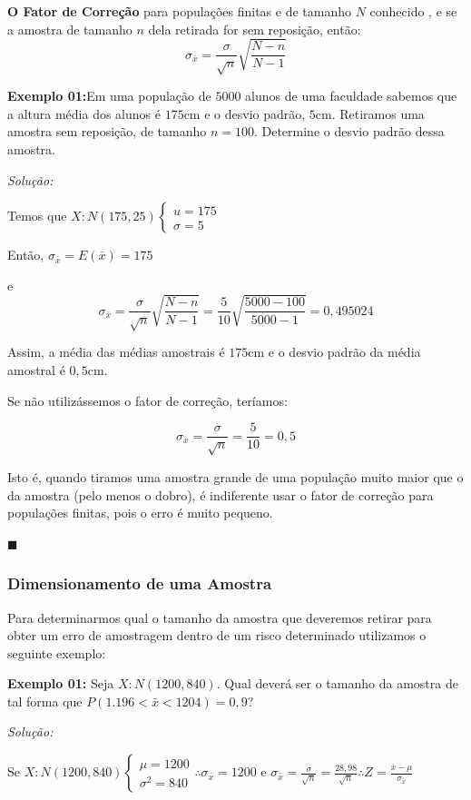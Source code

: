 \documentclass[oneside,a4paper,12pt]{article}
\begin{document}
{\bf O Fator de Correção} para populações finitas e de tamanho $N$ conhecido , e se a amostra de tamanho $n$ dela retirada for sem reposição, então:
$$\sigma_{\bar{x}} = \displaystyle \frac{\sigma}{\sqrt{n}}\sqrt{\frac{N - n}{N - 1}}$$

{\bf Exemplo 01:}Em uma população de $5000$ alunos de uma faculdade sabemos que a altura média dos alunos é $175$cm e o desvio padrão, $5$cm. Retiramos uma amostra sem reposição, de tamanho $n=100$. Determine o desvio padrão dessa amostra.

{\it Solução:}

Temos que $X:N(175,25) \begin{cases}
u = 175 \\
\sigma = 5
\end{cases}
$

Então, $\sigma_{\bar{x}} = E(\bar{x}) = 175$

e
$$\sigma_{\bar{x}} = \displaystyle \frac{\sigma}{\sqrt{n}}\sqrt{\frac{N - n}{N - 1}} = \displaystyle \frac{5}{10}\sqrt{\frac{5000 - 100}{5000 - 1}} = 0,495024$$

Assim, a média das médias amostrais é $175$cm e o desvio padrão da média amostral é $0,5$cm.

Se não utilizássemos o fator de correção, teríamos:

$$\sigma_{\bar{x}} = \displaystyle \frac{\sigma}{\sqrt{n}} = \frac{5}{10} = 0,5$$

Isto é, quando tiramos uma amostra grande de uma população muito maior que o da amostra (pelo menos o dobro), é indiferente usar o fator de correção para populações finitas, pois o erro é muito pequeno.

\begin{flushright}
	$\blacksquare$
\end{flushright}


\subsubsection{Dimensionamento de uma Amostra}

Para determinarmos qual o tamanho da amostra que deveremos retirar para obter um erro de amostragem dentro de um risco determinado utilizamos o seguinte exemplo:

{\bf Exemplo 01:} Seja $X:N(1200,840)$. Qual deverá ser o tamanho da amostra de tal forma que $P(1.196 < \bar{x} <1204) = 0,9$?

{\it Solução:}

Se $X:N(1200,840) \begin{cases}
\mu = 1200 \\
\sigma^2 = 840
\end{cases}
\therefore \sigma_{\bar{x}} = 1200
$
e
$\sigma_{\bar{x}} = \displaystyle \frac{\sigma}{\sqrt{n}} = \frac{28,98}{\sqrt{n}} \therefore Z = \frac{\bar{x} - \mu}{\sigma_{\bar{x}}}$
\end{document}
